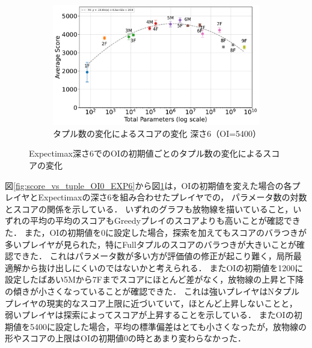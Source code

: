 \begin{figure}[t]
    \vspace{1em}
    \begin{subfigure}[b]{\linewidth}
        \centering
        \includegraphics[width=\linewidth]{pdf/parameter_performance_plots/params_performance_OI5400_EXP6.pdf}
        \caption{タプル数の変化によるスコアの変化 深さ6（OI=5400）}
        \label{fig:score_vs_tuple_OI5400_EXP6}
    \end{subfigure}

    \caption{Expectimax深さ6でのOIの初期値ごとのタプル数の変化によるスコアの変化}
    \label{fig:score_vs_tuple_all_EXP6}
\end{figure}

図\ref{fig:score_vs_tuple_OI0_EXP6}から図\ref{fig:score_vs_tuple_OI5400_EXP6}は，OIの初期値を変えた場合の各プレイヤとExpectimaxの深さ6を組み合わせたプレイヤでの，
パラメータ数の対数とスコアの関係を示している．
いずれのグラフも放物線を描いていること，いずれの平均の平均のスコアもGreedyプレイのスコアよりも高いことが確認できた．
また，OIの初期値を0に設定した場合，探索を加えてもスコアのバラつきが多いプレイヤが見られた，特にFullタプルのスコアのバラつきが大きいことが確認できた．
これはパラメータ数が多い方が評価値の修正が起こり難く，局所最適解から抜け出しにくいのではないかと考えられる．
またOIの初期値を1200に設定したばあい5Mから7Fまでスコアにほとんど差がなく，放物線の上昇と下降の傾きが小さくなっていることが確認できた．
これは強いプレイヤはNタプルプレイヤの現実的なスコア上限に近づいていて，ほとんど上昇しないことと，
弱いプレイヤは探索によってスコアが上昇することを示している．
またOIの初期値を5400に設定した場合，平均の標準偏差はとても小さくなったが，放物線の形やスコアの上限はOIの初期値0の時とあまり変わらなかった．


